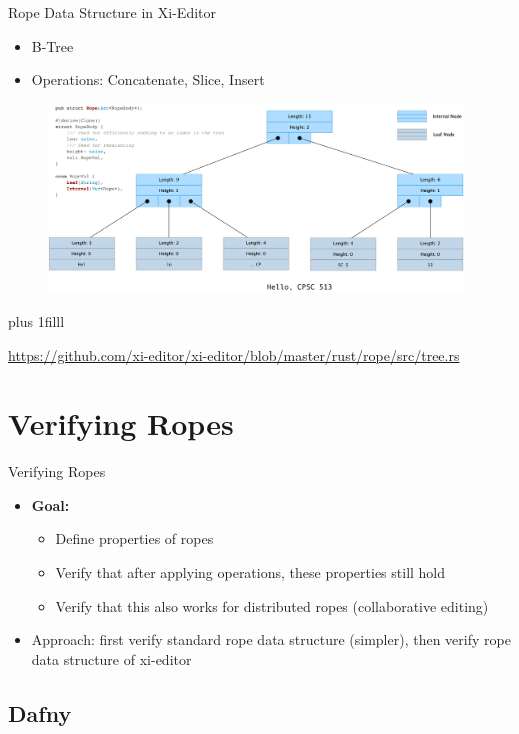 \documentclass{beamer}
\newcommand{\btVFill}{\vskip0pt plus 1filll}
\begin{document}
\begin{frame}{Rope Data Structure in Xi-Editor}
  \begin{itemize}
      \item B-Tree
      \item Operations: Concatenate, Slice, Insert
  \end{itemize}
  \begin{figure}
      \centering
      \includegraphics[width=11cm]{images/xi-rope.png}
  \end{figure}

  \btVFill

  \tiny{\url{https://github.com/xi-editor/xi-editor/blob/master/rust/rope/src/tree.rs}}
  \smallskip
\end{frame}


\section{Verifying Ropes}

\begin{frame}{Verifying Ropes}
  \begin{itemize}
      \item \textbf{Goal:}
        \begin{itemize}
          \item Define properties of ropes
          \item Verify that after applying operations, these properties still hold
          \item Verify that this also works for distributed ropes (collaborative editing)
        \end{itemize}
      \item Approach: first verify standard rope data structure (simpler), then verify rope data structure of xi-editor
  \end{itemize}
\end{frame}

\subsection{Dafny}
\end{document}
